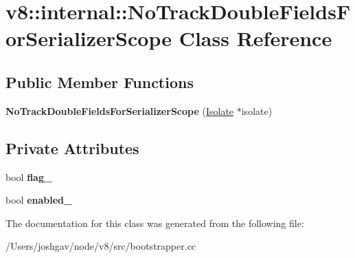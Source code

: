 \hypertarget{classv8_1_1internal_1_1_no_track_double_fields_for_serializer_scope}{}\section{v8\+:\+:internal\+:\+:No\+Track\+Double\+Fields\+For\+Serializer\+Scope Class Reference}
\label{classv8_1_1internal_1_1_no_track_double_fields_for_serializer_scope}
\subsection*{Public Member Functions}
\begin{DoxyCompactItemize}
\item 
{\bfseries No\+Track\+Double\+Fields\+For\+Serializer\+Scope} (\hyperlink{classv8_1_1internal_1_1_isolate}{Isolate} $\ast$isolate)\hypertarget{classv8_1_1internal_1_1_no_track_double_fields_for_serializer_scope_af5b6f9405be00be661ae1e644728f0fe}{}\label{classv8_1_1internal_1_1_no_track_double_fields_for_serializer_scope_af5b6f9405be00be661ae1e644728f0fe}

\end{DoxyCompactItemize}
\subsection*{Private Attributes}
\begin{DoxyCompactItemize}
\item 
bool {\bfseries flag\+\_\+}\hypertarget{classv8_1_1internal_1_1_no_track_double_fields_for_serializer_scope_a453cf943f3b800241d2ee01d19a0a67b}{}\label{classv8_1_1internal_1_1_no_track_double_fields_for_serializer_scope_a453cf943f3b800241d2ee01d19a0a67b}

\item 
bool {\bfseries enabled\+\_\+}\hypertarget{classv8_1_1internal_1_1_no_track_double_fields_for_serializer_scope_a58ca5672c09faf94decfbae29bba88d2}{}\label{classv8_1_1internal_1_1_no_track_double_fields_for_serializer_scope_a58ca5672c09faf94decfbae29bba88d2}

\end{DoxyCompactItemize}


The documentation for this class was generated from the following file\+:\begin{DoxyCompactItemize}
\item 
/\+Users/joshgav/node/v8/src/bootstrapper.\+cc\end{DoxyCompactItemize}
